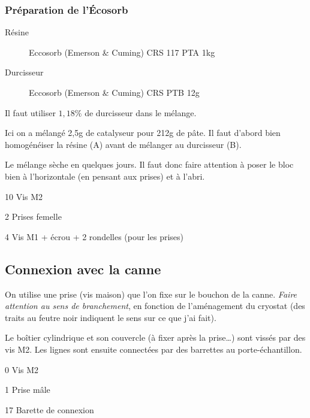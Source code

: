 \subsubsection{Préparation de l'Écosorb}
\begin{description}
    \item[Résine] Eccosorb (Emerson \& Cuming) CRS 117 PTA 1kg
    \item[Durcisseur] Eccosorb (Emerson \& Cuming) CRS PTB 12g
\end{description}
Il faut utiliser $1,18\%$ de durcisseur dans le mélange.

Ici on a mélangé 2,5g de catalyseur pour 212g de pâte. Il faut d'abord bien homogénéiser la résine (A) avant de mélanger au durcisseur (B).

Le mélange sèche en quelques jours. Il faut donc faire attention à poser le bloc bien à l'horizontale (en pensant aux prises) et à l'abri.


\begin{BOM}
    \item 10 \fois Vis M2
    \item 2 \fois Prises \uD femelle
    \item 4 \fois Vis M1 + écrou + 2 rondelles (pour les prises)
\end{BOM}

\subsection{Connexion avec la canne}
On utilise une prise \uD (vis maison) que l'on fixe sur le bouchon de la canne. \emph{Faire attention au sens de branchement}, en fonction de l'aménagement du cryostat (des traits au feutre noir indiquent le sens sur ce que j'ai fait).

Le boîtier cylindrique et son couvercle (à fixer après la prise…) sont vissés par des vis M2. Les lignes sont ensuite connectées par des barrettes au porte-échantillon.

\begin{BOM}
    \item 0 \fois Vis M2
    \item 1 \fois Prise \uD mâle
    \item 17 \fois Barette de connexion
\end{BOM}

